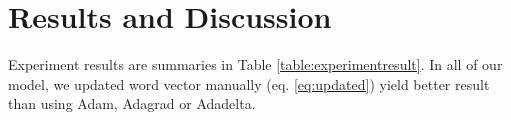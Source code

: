 \hypertarget{chap:result}{\chapter{Results and Discussion}}\label{result-discuss}
Experiment results are summaries in Table \ref{table:experimentresult}. In all of our model, we updated word vector manually (eq. \ref{eq:updated}) yield better result than using Adam, Adagrad or Adadelta.


